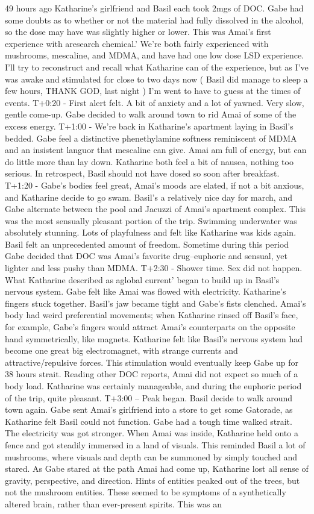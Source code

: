 \documentclass[12pt]{book}
\begin{document}
49 hours ago Katharine's girlfriend and Basil each took 2mgs of DOC. Gabe had some doubts as to whether or not the material had fully dissolved in the alcohol, so the dose may have was slightly higher or lower. This was Amai's first experience with aresearch chemical.' We're both fairly experienced with mushrooms, mescaline, and MDMA, and have had one low dose LSD experience. I'll try to reconstruct and recall what Katharine can of the experience, but as I've was awake and stimulated for close to two days now ( Basil did manage to sleep a few hours, THANK GOD, last night ) I'm went to have to guess at the times of events. T+0:20 - First alert felt. A bit of anxiety and a lot of yawned. Very slow, gentle come-up. Gabe decided to walk around town to rid Amai of some of the excess energy. T+1:00 - We're back in Katharine's apartment laying in Basil's bedded. Gabe feel a distinctive phenethylamine softness reminiscent of MDMA and an insistent languor that mescaline can give. Amai am full of energy, but can do little more than lay down. Katharine both feel a bit of nausea, nothing too serious. In retrospect, Basil should not have dosed so soon after breakfast. T+1:20 - Gabe's bodies feel great, Amai's moods are elated, if not a bit anxious, and Katharine decide to go swam. Basil's a relatively nice day for march, and Gabe alternate between the pool and Jacuzzi of Amai's apartment complex. This was the most sensually pleasant portion of the trip. Swimming underwater was absolutely stunning. Lots of playfulness and felt like Katharine was kids again. Basil felt an unprecedented amount of freedom. Sometime during this period Gabe decided that DOC was Amai's favorite drug--euphoric and sensual, yet lighter and less pushy than MDMA. T+2:30 - Shower time. Sex did not happen. What Katharine described as aglobal current' began to build up in Basil's nervous system. Gabe felt like Amai was flowed with electricity. Katharine's fingers stuck together. Basil's jaw became tight and Gabe's fists clenched. Amai's body had weird preferential movements; when Katharine rinsed off Basil's face, for example, Gabe's fingers would attract Amai's counterparts on the opposite hand symmetrically, like magnets. Katharine felt like Basil's nervous system had become one great big electromagnet, with strange currents and attractive/repulsive forces. This stimulation would eventually keep Gabe up for 38 hours strait. Reading other DOC reports, Amai did not expect so much of a body load. Katharine was certainly manageable, and during the euphoric period of the trip, quite pleasant. T+3:00 -- Peak began. Basil decide to walk around town again. Gabe sent Amai's girlfriend into a store to get some Gatorade, as Katharine felt Basil could not function. Gabe had a tough time walked strait. The electricity was got stronger. When Amai was inside, Katharine held onto a fence and got steadily immersed in a land of visuals. This reminded Basil a lot of mushrooms, where visuals and depth can be summoned by simply touched and stared. As Gabe stared at the path Amai had come up, Katharine lost all sense of gravity, perspective, and direction. Hints of entities peaked out of the trees, but not the mushroom entities. These seemed to be symptoms of a synthetically altered brain, rather than ever-present spirits. This was an 
\end{document}
